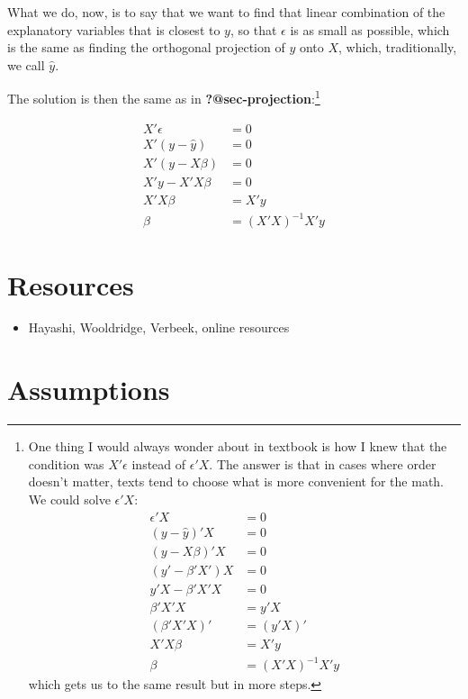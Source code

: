 \documentclass[
  letterpaper,
  DIV=11,
  numbers=noendperiod]{scrreprt}
\providecommand{\tightlist}{%
  \setlength{\itemsep}{0pt}\setlength{\parskip}{0pt}}\usepackage{longtable,booktabs,array}
\begin{document}
What we do, now, is to say that we want to find that linear combination
of the explanatory variables that is closest to \(y\), so that
\(\epsilon\) is as small as possible, which is the same as finding the
orthogonal projection of \(y\) onto \(X\), which, traditionally, we call
\(\hat{y}\).

The solution is then the same as in
\textbf{?@sec-projection}:\footnote{One thing I would always wonder
  about in textbook is how I knew that the condition was \(X'\epsilon\)
  instead of \(\epsilon'X\). The answer is that in cases where order
  doesn't matter, texts tend to choose what is more convenient for the
  math. We could solve \(\epsilon'X\): \[
  \begin{aligned}
  \epsilon'X &= 0 \\
  (y - \hat{y})'X &= 0 \\
  (y - X\beta)'X &= 0 \\
  (y' - \beta'X')X &= 0 \\
  y'X - \beta'X'X &= 0 \\
  \beta'X'X &= y'X \\
  (\beta'X'X)' &= (y'X)' \\
  X'X\beta &= X'y \\
  \beta &= (X'X)^{-1}X'y
  \end{aligned}
  \] which gets us to the same result but in more steps.}

\[
\begin{aligned}
X'\epsilon &= 0 \\
X'(y - \hat{y}) &= 0 \\
X'(y - X\beta) &= 0 \\
X'y - X'X\beta &= 0 \\
X'X\beta &= X'y \\
\beta &= (X'X)^{-1}X'y
\end{aligned}
\]

\hypertarget{resources}{%
\section{Resources}\label{resources}}

\begin{itemize}
\tightlist
\item
  Hayashi, Wooldridge, Verbeek, online resources
\end{itemize}

\hypertarget{assumptions}{%
\section{Assumptions}\label{assumptions}}
\end{document}
